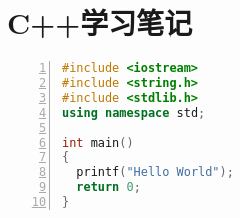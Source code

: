 \chapter{C++学习笔记}
\begin{lstlisting}[language=C++, numbers=left, 
         numberstyle=\tiny,keywordstyle=\color{blue!70},
         commentstyle=\color{red!50!green!50!blue!50},frame=shadowbox,
         rulesepcolor=\color{red!20!green!20!blue!20},basicstyle=\ttfamily]
#include <iostream>
#include <string.h>
#include <stdlib.h>
using namespace std;

int main()
{
  printf("Hello World");
  return 0;
}
\end{lstlisting}